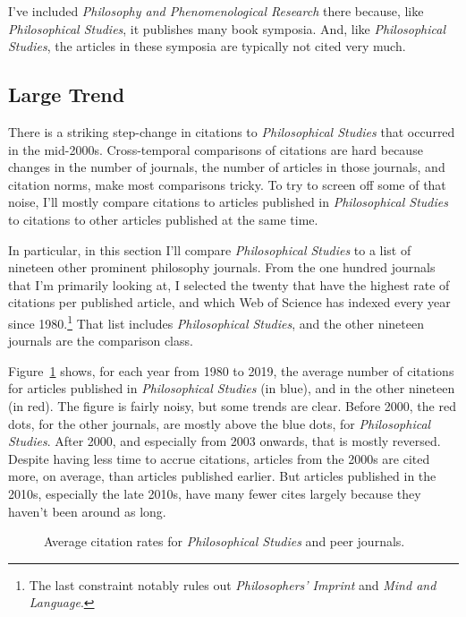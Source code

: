 \documentclass[
  10pt,
  letterpaper,
  DIV=11,
  numbers=noendperiod,
  twoside]{scrartcl}
\begin{document}
I've included \emph{Philosophy and Phenomenological Research} there
because, like \emph{Philosophical Studies}, it publishes many book
symposia. And, like \emph{Philosophical Studies}, the articles in these
symposia are typically not cited very much.

\subsection{Large Trend}\label{sec-large-trend}

There is a striking step-change in citations to \emph{Philosophical
Studies} that occurred in the mid-2000s. Cross-temporal comparisons of
citations are hard because changes in the number of journals, the number
of articles in those journals, and citation norms, make most comparisons
tricky. To try to screen off some of that noise, I'll mostly compare
citations to articles published in \emph{Philosophical Studies} to
citations to other articles published at the same time.

In particular, in this section I'll compare \emph{Philosophical Studies}
to a list of nineteen other prominent philosophy journals. From the one
hundred journals that I'm primarily looking at, I selected the twenty
that have the highest rate of citations per published article, and which
Web of Science has indexed every year since 1980.\footnote{The last
  constraint notably rules out \emph{Philosophers' Imprint} and
  \emph{Mind and Language}.} That list includes \emph{Philosophical
Studies}, and the other nineteen journals are the comparison class.

Figure~\ref{fig-compare-cites-dots} shows, for each year from 1980 to
2019, the average number of citations for articles published in
\emph{Philosophical Studies} (in blue), and in the other nineteen (in
red). The figure is fairly noisy, but some trends are clear. Before
2000, the red dots, for the other journals, are mostly above the blue
dots, for \emph{Philosophical Studies}. After 2000, and especially from
2003 onwards, that is mostly reversed. Despite having less time to
accrue citations, articles from the 2000s are cited more, on average,
than articles published earlier. But articles published in the 2010s,
especially the late 2010s, have many fewer cites largely because they
haven't been around as long.

\begin{figure}


\caption{\label{fig-compare-cites-dots}Average citation rates for
\emph{Philosophical Studies} and peer journals.}

\end{figure}%
\end{document}
